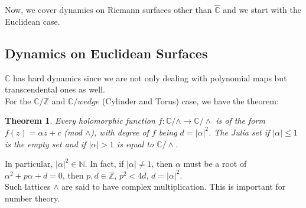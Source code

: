\documentclass[a4paper, 11pt]{book}
\newtheorem{theorem}{Theorem}
\theoremstyle{definition}
\theoremstyle{remark}
\begin{document}
    Now, we cover dynamics on Riemann surfaces other than $\hat{\mathbb{C}}$ and we start with the Euclidean case.

    \subsection{Dynamics on Euclidean Surfaces}

    $\mathbb{C}$ has hard dynamics since we are not only dealing with polynomial maps but transcendental ones as well.\\

    For the $\mathbb{C}/\mathbb{Z}$ and $\mathbb{C}/wedge$ (Cylinder and Torus) case, we have the theorem:

    \begin{theorem}
        Every holomorphic function $f: \mathbb{C}/\wedge \to \mathbb{C}/\wedge$ is of the form $f(z) = \alpha z + c$ 
        (mod $\wedge$), with degree of $f$ being $d = |\alpha|^2$. The Julia set if $|\alpha|\leq 1$ is the empty set and if
        $|\alpha|>1$ is equal to $\mathbb{C}/\wedge$.
    \end{theorem}

    In particular, $|\alpha|^2\in\mathbb{N}$. In fact, if $|\alpha|\neq 1$, then $\alpha$ must be a root of
    $\alpha^2 + p\alpha + d = 0$, then $p,d\in\mathbb{Z}$, $p^2 < 4d$, $d = |\alpha|^2$.\\

    Such lattices $\wedge$ are said to have complex multiplication. This is important for number theory.
    
\end{document}
